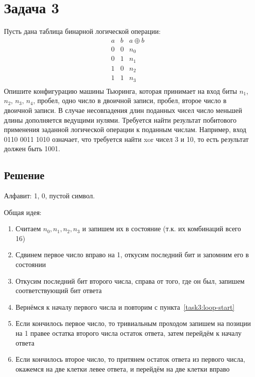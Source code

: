 \section{Задача 3}
Пусть дана таблица бинарной логической операции:
\[
    \begin{array}{ccc}
        a & b & a \oplus b \\ \hline
        0 & 0 & n_0 \\
        0 & 1 & n_1 \\
        1 & 0 & n_2 \\
        1 & 1 & n_3 \\
    \end{array}
\]
Опишите конфигурацию машины Тьюринга,
которая принимает на вход биты $n_1$, $n_2$, $n_3$, $n_4$,
пробел, одно число в двоичной записи,
пробел, второе число в двоичной записи.
В случае несовпадения длин поданных чисел число
меньшей длины дополняется ведущими нулями.
Требуется найти результат побитового применения
заданной логической операции к поданным числам.
Например, вход 0110 0011 1010 означает,
что требуется найти xor чисел 3 и 10,
то есть результат должен быть 1001.

\subsection{Решение}
Алфавит: 1, 0, пустой символ.

Общая идея:
\begin{enumerate}
    \item Считаем $n_0, n_1, n_2, n_3$ и запишем их в состояние
    (т.к. их комбинаций всего 16)

    \item \label{task3:loop-start} Сдвинем первое число вправо на 1,
    откусим последний бит и запомним его в состоянии

    \item Откусим последний бит второго числа,
    справа от того, где он был, запишем соответствующий бит ответа

    \item Вернёмся к началу первого числа и повторим
    с пункта~\ref{task3:loop-start}

    \item Если кончилось первое число,
    то тривиальным проходом запишем на позиции
    на 1 правее остатка второго числа остаток ответа,
    затем перейдём к началу ответа

    \item Если кончилось второе число,
    то притянем остаток ответа из первого числа,
    окажемся на две клетки левее ответа,
    и перейдём на две клетки вправо
\end{enumerate}


